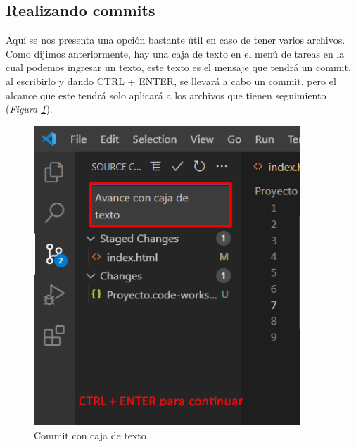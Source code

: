\subsection{Realizando commits}
\hspace{0.55cm}Aquí se nos presenta una opción bastante útil en caso de tener varios archivos. Como dijimos anteriormente, hay una caja de texto en el menú de tareas en la cual podemos ingresar un texto, este texto es el mensaje que tendrá un commit, al escribirlo y dando CTRL + ENTER, se llevará a cabo un commit, pero el alcance que este tendrá solo aplicará a los archivos que tienen seguimiento (\textit{Figura \ref{fig: 21}}).
\begin{figure}[H]
    \centering
    \caption{Commit con caja de texto}
    \label{fig: 21}
    \includegraphics[width=10cm]{capturas/commits1.png}
\end{figure}

